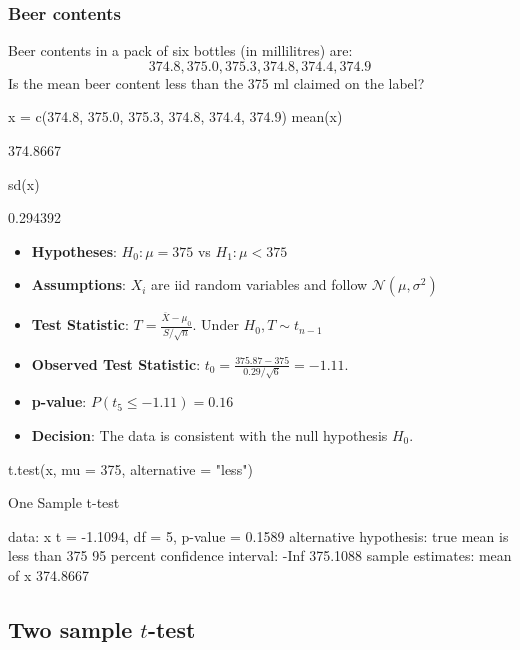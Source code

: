 \documentclass[a4paper]{article}
\begin{document}
\subsubsection{Beer contents}
Beer contents in a pack of six bottles (in millilitres) are:
\[
	374.8, 375.0, 375.3, 374.8, 374.4, 374.9
\]
Is the mean beer content less than the 375 ml claimed on the label?
\begin{Schunk}
\begin{Sinput}
x = c(374.8, 375.0, 375.3, 374.8, 374.4, 374.9)
mean(x)
\end{Sinput}
\begin{Soutput}
[1] 374.8667
\end{Soutput}
\begin{Sinput}
sd(x)
\end{Sinput}
\begin{Soutput}
[1] 0.294392
\end{Soutput}
\end{Schunk}
\begin{itemize}
	\item \textbf{Hypotheses}: \( H_0: \mu = 375 \) vs \( H_1: \mu < 375 \)
	\item \textbf{Assumptions}: \( X_i \) are iid random variables and follow \( \mathcal{N} (\mu,\sigma^2) \) 
	\item \textbf{Test Statistic}: \( T = \frac{\overline{X} - \mu_0}{S / \sqrt{n}} \). Under \( H_0, T \sim t_{n-1} \)   
	\item \textbf{Observed Test Statistic}: \( t_0 = \frac{375.87 - 375}{0.29 / \sqrt{6}} = -1.11 \).
	\item \textbf{p-value}: \( P(t_5 \leq -1.11) = 0.16 \)
	\item \textbf{Decision}: The data is consistent with the null hypothesis \( H_0 \).
\end{itemize}
\begin{Schunk}
\begin{Sinput}
t.test(x, mu = 375, alternative = "less")
\end{Sinput}
\begin{Soutput}

	One Sample t-test

data:  x
t = -1.1094, df = 5, p-value = 0.1589
alternative hypothesis: true mean is less than 375
95 percent confidence interval:
     -Inf 375.1088
sample estimates:
mean of x 
 374.8667 
\end{Soutput}
\end{Schunk}
\subsection{Two sample \( t \)-test}
\end{document}
